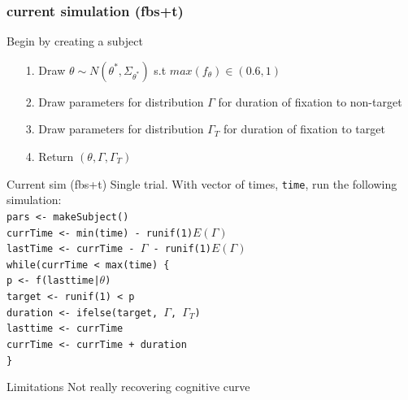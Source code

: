 \documentclass{beamer}
\newcommand{\code}[1]{\texttt{#1}}
\begin{document}
\begin{frame}[fragile]
\frametitle{current simulation (fbs+t)}
Begin by creating a subject \newline \\

  \begin{enumerate}
  \item[1.] Draw $\theta \sim N(\theta^*, \Sigma_{\theta^*})$ s.t $max(f_{\theta}) \in (0.6, 1)$
  \item[2.] Draw parameters for distribution $\Gamma$ for duration of fixation to non-target
  \item[3.] Draw parameters for distribution $\Gamma_T$ for duration of fixation to target
  \item[4.] Return $(\theta, \Gamma, \Gamma_T)$
  \end{enumerate}

\end{frame}

\begin{frame}{Current sim (fbs+t)}
Single trial. With vector of times, \code{time}, run the following simulation:\newline \\

\code{pars <- makeSubject()} \\
\code{currTime <- min(time) - runif(1)}$E(\Gamma)$ \\
\code{lastTime <- currTime - }$\Gamma$\code{ - runif(1)}$E(\Gamma)$\newline \\
\code{while(currTime < max(time) \{} \\
\hspace{4mm} \code{p <- f(lasttime|}$\theta$\code{)} \\
\hspace{4mm} \code{target <- runif(1) < p} \\
\hspace{4mm} \code{duration <- ifelse(target, }$\Gamma$\code{, }$\Gamma_T$\code{)} \\
\hspace{4mm} \code{lasttime <- currTime} \\
\hspace{4mm} \code{currTime <- currTime + duration} \\
\code{\}}
\end{frame}

\begin{frame}{Limitations}
Not really recovering cognitive curve \newline 

\end{frame}
\end{document}
